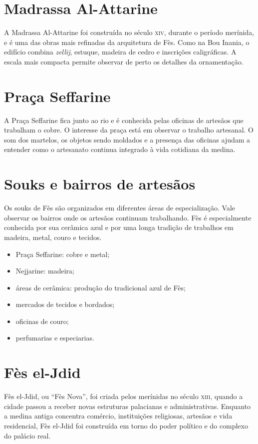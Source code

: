 \chapter{Madrassa Al-Attarine}

A Madrassa Al-Attarine foi construída no século \textsc{xiv}, durante o período merínida, e é uma das obras mais refinadas da arquitetura de Fès. Como na Bou Inania, o edifício combina \textit{zellij}, estuque, madeira de cedro e inscrições caligráficas. A escala mais compacta permite observar de perto os detalhes da ornamentação.

\chapter{Praça Seffarine}

A Praça Seffarine fica junto ao rio e é conhecida pelas oficinas de artesãos que trabalham o cobre. O interesse da praça está em observar o trabalho artesanal. O som dos martelos, os objetos sendo moldados e a presença das oficinas ajudam a entender como o artesanato continua integrado à vida cotidiana da medina.

\chapter{Souks e bairros de artesãos}

Os souks de Fès são organizados em diferentes áreas de especialização. Vale observar os bairros onde os artesãos continuam trabalhando. Fès é especialmente conhecida por sua cerâmica azul e por uma longa tradição de trabalhos em madeira, metal, couro e tecidos.

\begin{itemize}
\item Praça Seffarine: cobre e metal;
\item Nejjarine: madeira;
\item áreas de cerâmica: produção do tradicional azul de Fès;
\item mercados de tecidos e bordados;
\item oficinas de couro;
\item perfumarias e especiarias.
\end{itemize}

\chapter{Fès el-Jdid}

Fès el-Jdid, ou ``Fès Nova'', foi criada pelos merínidas no século \textsc{xiii}, quando a cidade passou a receber novas estruturas palacianas e administrativas. Enquanto a medina antiga concentra comércio, instituições religiosas, artesãos e vida residencial, Fès el-Jdid foi construída em torno do poder político e do complexo do palácio real.

